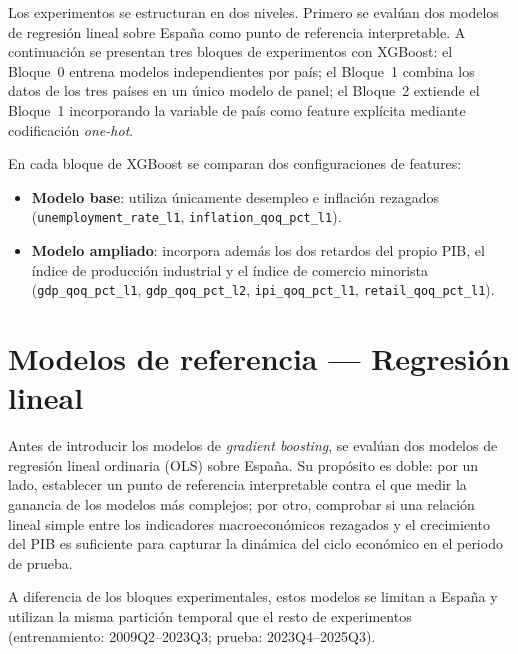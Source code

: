 Los experimentos se estructuran en dos niveles. Primero se evalúan dos modelos de regresión lineal sobre España como punto de referencia interpretable. A continuación se presentan tres bloques de experimentos con XGBoost: el Bloque~0 entrena modelos independientes por país; el Bloque~1 combina los datos de los tres países en un único modelo de panel; el Bloque~2 extiende el Bloque~1 incorporando la variable de país como feature explícita mediante codificación \textit{one-hot}.

En cada bloque de XGBoost se comparan dos configuraciones de features:

\begin{itemize}
    \item \textbf{Modelo base}: utiliza únicamente desempleo e inflación rezagados (\texttt{unemployment\_\allowbreak{}rate\_\allowbreak{}l1}, \texttt{inflation\_\allowbreak{}qoq\_\allowbreak{}pct\_\allowbreak{}l1}).
    \item \textbf{Modelo ampliado}: incorpora además los dos retardos del propio PIB, el índice de producción industrial y el índice de comercio minorista (\texttt{gdp\_\allowbreak{}qoq\_\allowbreak{}pct\_\allowbreak{}l1}, \texttt{gdp\_\allowbreak{}qoq\_\allowbreak{}pct\_\allowbreak{}l2}, \texttt{ipi\_\allowbreak{}qoq\_\allowbreak{}pct\_\allowbreak{}l1}, \texttt{retail\_\allowbreak{}qoq\_\allowbreak{}pct\_\allowbreak{}l1}).
\end{itemize}

\FloatBarrier
\section{Modelos de referencia --- Regresión lineal}

Antes de introducir los modelos de \textit{gradient boosting}, se evalúan dos modelos de
regresión lineal ordinaria (OLS) sobre España. Su propósito es doble: por un lado,
establecer un punto de referencia interpretable contra el que medir la ganancia de los
modelos más complejos; por otro, comprobar si una relación lineal simple entre los
indicadores macroeconómicos rezagados y el crecimiento del PIB es suficiente para capturar
la dinámica del ciclo económico en el periodo de prueba.

A diferencia de los bloques experimentales, estos modelos se limitan a España y utilizan
la misma partición temporal que el resto de experimentos
(entrenamiento: 2009Q2--2023Q3; prueba: 2023Q4--2025Q3).

